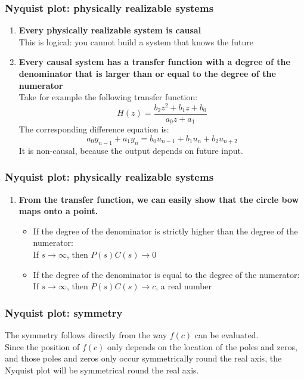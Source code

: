 \begin{frame}
	\frametitle{Nyquist plot: physically realizable systems}
	\begin{enumerate}
		\item \textbf{Every physically realizable system is causal}\\
		This is logical: you cannot build a system that knows the future
		\item \textbf{Every causal system has a transfer function with a degree of the denominator that is larger than or equal to the degree of the numerator}\\
		Take for example the following transfer function:
		$$H(z)=\frac{b_2z^2+b_1z+b_0}{a_0z+a_1}$$
		The corresponding difference equation is: 
		$$a_0y_{n-1}+a_1y_n=b_0u_{n-1}+b_1u_n+b_2u_{n+2}$$
		It is non-causal, because the output depends on future input.
		\asuivre
	\end{enumerate}
\end{frame}

\begin{frame}
	\frametitle{Nyquist plot: physically realizable systems}
	\vspace{-8ex}
	\begin{enumerate}
		\suite
		\item \textbf{From the transfer function, we can easily show that the circle bow maps onto a point.}\\
		\begin{itemize}
			\item If the degree of the denominator is strictly higher than the degree of the numerator:\\
			If $s\rightarrow \infty$, then $P(s)C(s)\rightarrow 0$
			\item If the degree of the denominator is equal to the degree of the numerator:\\
			If $s\rightarrow \infty$, then $P(s)C(s)\rightarrow c$, a real number
		\end{itemize}
	\end{enumerate}
\end{frame}

\begin{frame}
	\frametitle{Nyquist plot: symmetry}
	\vspace{-12ex}
	The symmetry follows directly from the way $f(c)$ can be evaluated.\\
	\medskip
	Since the position of $f(c)$ only depends on the location of the poles and zeros, and those poles and zeros only occur symmetrically round the real axis, the Nyquist plot will be symmetrical round the real axis.
\end{frame}

